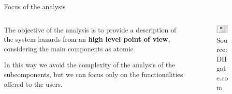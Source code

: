 \begin{frame}{Focus of the analysis}

  \begin{columns}
   \begin{column}{.50\textwidth}
      The objective of the analysis is to provide a description
      of the system hazards from an
      {\textcolor{green!40!black}{\fontsize{13}{15}\textbf{high level point of view}}},
      considering the main components as atomic.

      \vskip 0.8cm

      In this way we avoid the complexity of the analysis of the subcomponents,
      but we can focus only on the functionalities offered to the users.

   \end{column}

   \begin{column}{.50\textwidth}
   \vskip 0.3cm

   \begin{figure}[ht!]
     \centering
     \includegraphics[width=50mm]{images/keypad.jpg}
     \caption{Source: DHgate.com}
   \end{figure}

   \end{column}
 \end{columns}

\end{frame}

